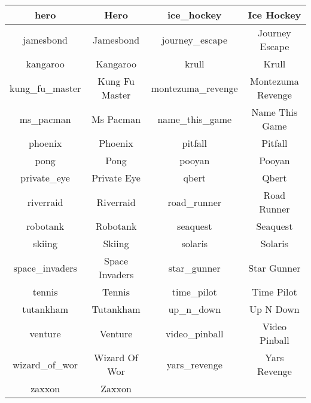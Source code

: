 \begin{center}
\begin{longtable}{ |c||c|c||c| }
        \hline
        hero             & Hero            & ice\_hockey        & Ice Hockey        \\
        \hline
        jamesbond        & Jamesbond       & journey\_escape    & Journey Escape    \\
        \hline
        kangaroo         & Kangaroo        & krull              & Krull             \\
        \hline
        kung\_fu\_master & Kung Fu Master  & montezuma\_revenge & Montezuma Revenge \\
        \hline
        ms\_pacman       & Ms Pacman       & name\_this\_game   & Name This Game    \\
        \hline
        phoenix          & Phoenix         & pitfall            & Pitfall           \\
        \hline
        pong             & Pong            & pooyan             & Pooyan            \\
        \hline
        private\_eye     & Private Eye     & qbert              & Qbert             \\
        \hline
        riverraid        & Riverraid       & road\_runner       & Road Runner       \\
        \hline
        robotank         & Robotank        & seaquest           & Seaquest          \\
        \hline
        skiing           & Skiing          & solaris            & Solaris           \\
        \hline
        space\_invaders  & Space Invaders  & star\_gunner       & Star Gunner       \\
        \hline
        tennis           & Tennis          & time\_pilot        & Time Pilot        \\
        \hline
        tutankham        & Tutankham       & up\_n\_down        & Up N Down         \\
        \hline
        venture          & Venture         & video\_pinball     & Video Pinball     \\
        \hline
        wizard\_of\_wor  & Wizard Of Wor   & yars\_revenge      & Yars Revenge      \\
        \hline
        zaxxon           & Zaxxon                                                   \\
        \hline
    \end{longtable}
\end{center}


